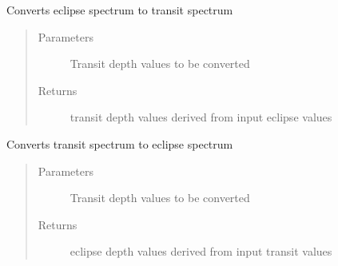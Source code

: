 \documentclass[a4paper,11pt,english]{sphinxmanual}
\begin{document}

\begin{fulllineitems}
\label{\detokenize{cascade.exoplanet_tools:cascade.exoplanet_tools.exoplanet_tools.eclipse_to_transit}}
Converts eclipse spectrum to transit spectrum
\begin{quote}\begin{description}
\item[{Parameters}] \leavevmode
{} \textendash{} Transit depth values to be converted

\item[{Returns}] \leavevmode
{} \textendash{} transit depth values derived from input eclipse values

\end{description}\end{quote}

\end{fulllineitems}


\begin{fulllineitems}
\label{\detokenize{cascade.exoplanet_tools:cascade.exoplanet_tools.exoplanet_tools.transit_to_eclipse}}
Converts transit spectrum to eclipse spectrum
\begin{quote}\begin{description}
\item[{Parameters}] \leavevmode
{} \textendash{} Transit depth values to be converted

\item[{Returns}] \leavevmode
{} \textendash{} eclipse depth values derived from input transit values

\end{description}\end{quote}

\end{fulllineitems}
\end{document}
